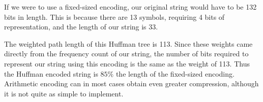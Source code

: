 \documentclass[12pt]{article}
\begin{document}
If we were to use a fixed-sized encoding, our original string would have to be 132 bits in length.  This is because there are 13 symbols, requiring 4 bits of representation, and the length of our string is 33.

The weighted path length of this Huffman tree is 113.  Since these weights came directly from the frequency count of our string, the number of bits required to represent our string using this encoding is the same as the weight of 113.  Thus the Huffman encoded string is $85\%$ the length of the fixed-sized encoding.  Arithmetic encoding can in most cases obtain even greater compression, although it is not quite as simple to implement.
\end{document}
